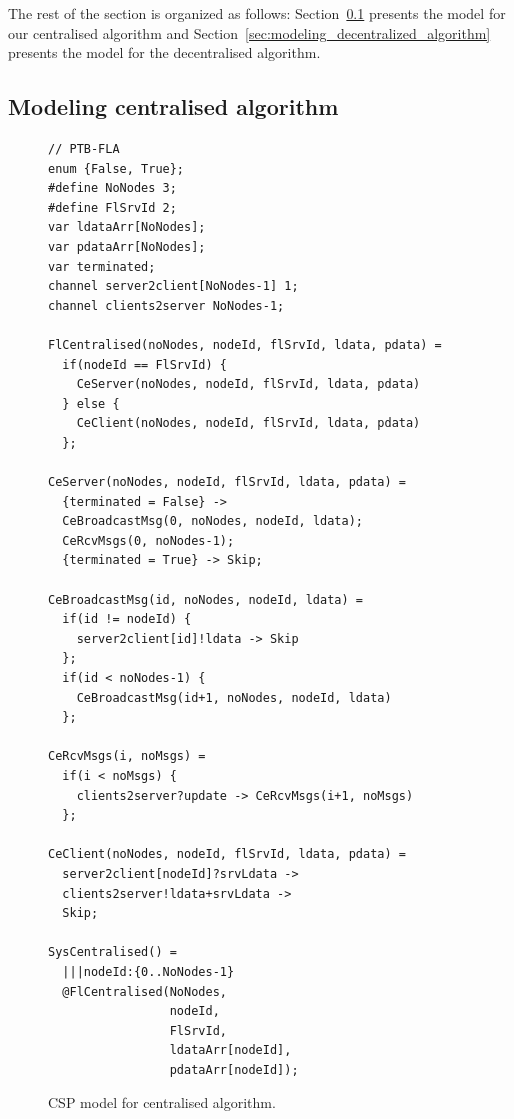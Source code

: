 \documentclass[runningheads]{llncs}
\begin{document}
The rest of the section is organized as follows: Section~\ref{sec:modeling_centralized_algorithm} presents the model for our centralised algorithm and Section~\ref{sec:modeling_decentralized_algorithm}  presents the model for the decentralised algorithm.

\subsection{Modeling centralised algorithm}\label{sec:modeling_centralized_algorithm}

\begin{figure}
\begin{lstlisting}[frame=single]
// PTB-FLA
enum {False, True};
#define NoNodes 3;
#define FlSrvId 2;
var ldataArr[NoNodes];
var pdataArr[NoNodes];
var terminated;
channel server2client[NoNodes-1] 1;  
channel clients2server NoNodes-1;    

FlCentralised(noNodes, nodeId, flSrvId, ldata, pdata) =
  if(nodeId == FlSrvId) {
    CeServer(noNodes, nodeId, flSrvId, ldata, pdata)
  } else {
    CeClient(noNodes, nodeId, flSrvId, ldata, pdata)
  };

CeServer(noNodes, nodeId, flSrvId, ldata, pdata) =
  {terminated = False} ->
  CeBroadcastMsg(0, noNodes, nodeId, ldata);
  CeRcvMsgs(0, noNodes-1);
  {terminated = True} -> Skip;

CeBroadcastMsg(id, noNodes, nodeId, ldata) =
  if(id != nodeId) {
    server2client[id]!ldata -> Skip
  };
  if(id < noNodes-1) {
    CeBroadcastMsg(id+1, noNodes, nodeId, ldata)
  };

CeRcvMsgs(i, noMsgs) =
  if(i < noMsgs) {
    clients2server?update -> CeRcvMsgs(i+1, noMsgs)
  };

CeClient(noNodes, nodeId, flSrvId, ldata, pdata) =
  server2client[nodeId]?srvLdata ->
  clients2server!ldata+srvLdata ->
  Skip;

SysCentralised() = 
  |||nodeId:{0..NoNodes-1}
  @FlCentralised(NoNodes, 
                 nodeId, 
                 FlSrvId, 
                 ldataArr[nodeId], 
                 pdataArr[nodeId]);
\end{lstlisting}
\caption{CSP model for centralised algorithm.}
\label{fig:CSP_centralized}
\end{figure}
\end{document}
